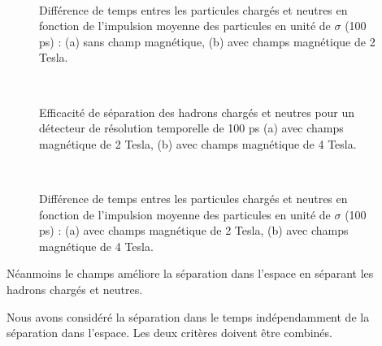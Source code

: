 \begin{figure}[H]
  \centering 
  \mbox{ }
  \caption{Différence de temps entres les particules chargés et neutres en fonction de l'impulsion moyenne des particules en unité de $\sigma$ (100 ps)  : (a) sans champ magnétique, (b) avec champs magnétique de 2 Tesla.} 
  \label{figure:6.4}
\end{figure}

\begin{figure}[H]
  \centering 
  \mbox{ }
  \caption{Efficacité de séparation des hadrons chargés et neutres pour un détecteur de résolution temporelle de 100 ps (a) avec champs magnétique de 2 Tesla, (b) avec champs magnétique de 4 Tesla.} 
  \label{figure:6.5}
\end{figure}

\begin{figure}[H]
  \centering 
  \mbox{ }
  \caption{Différence de temps entres les particules chargés et neutres en fonction de l'impulsion moyenne des particules en unité de $\sigma$ (100 ps)  : (a) avec champs magnétique de 2 Tesla, (b) avec champs magnétique de 4 Tesla.} 
  \label{figure:6.6}
\end{figure}

Néanmoins le champs améliore la séparation dans l'espace en séparant les hadrons chargés et neutres. 
~\par Nous avons considéré la séparation dans le temps indépendamment de la séparation dans l'espace. Les deux critères doivent être combinés.